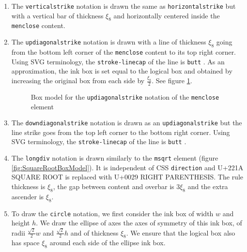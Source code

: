 \begin{enumerate}
\item The {\tt verticalstrike} notation is drawn the same as
  {\tt horizontalstrike} but with a vertical bar
  of thickness $\xi_8$ and horizontally centered inside the {\tt menclose}
  content.
\item The {\tt updiagonalstrike} notation is drawn with a line
  of thickness $\xi_8$  going from the bottom left corner of the {\tt menclose}
  content to its top right corner. Using SVG terminology, the
  {\tt stroke-linecap} of the line is {\tt butt} \cite{SVG11}.
  As an approximation, the ink box
  is set equal to the logical box and obtained by increasing the original box
  from each side by $\frac{\xi_8}{2}$.
  See figure \ref{fig:MencloseUpDiagonalStrikeBoxModel}.

  \begin{figure}
\centering
{}
  \caption{Box model for the {\tt updiagonalstrike}
    notation of the {\tt menclose} element}
\label{fig:MencloseUpDiagonalStrikeBoxModel}
\end{figure}

\item The {\tt downdiagonalstrike} notation is drawn as an
  {\tt updiagonalstrike}
  but the line strike goes from the top left corner to the bottom right corner.
  Using SVG terminology, the
  {\tt stroke-linecap} of the line is {\tt butt} \cite{SVG11}.
\item The {\tt longdiv} notation is drawn similarly to the {\tt msqrt} element
  (figure \ref{fig:SquareRootBoxModel}). It is independent of CSS
  {\tt direction} and U+221A SQUARE ROOT is replaced with
  U+0029 RIGHT PARENTHESIS. The rule thickness is $\xi_8$,
  the gap between content and overbar is $3\xi_8$ and the extra ascender
  is $\xi_8$.
\item  To draw the {\tt circle} notation, we first consider the ink box of
  width $w$ and height $h$. We draw the ellipse
  of axes the axes of symmetry of this ink box, of radii
  $\frac{\sqrt{2}}{2} w$ and $\frac{\sqrt{2}}{2} h$ and of thickness $\xi_8$.
  We ensure that the logical box also has space $\xi_8$ around each side
  of the ellipse ink box.
  \begin{figure}
\centering
\begin{tikzpicture}[yscale=-1]


\end{tikzpicture}
\end{figure}
\end{enumerate}
